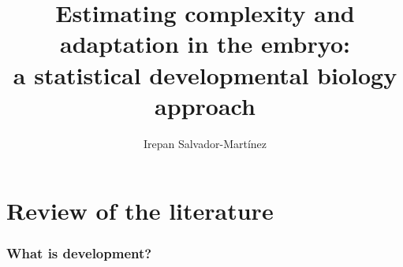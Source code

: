 \documentclass[officiallayout]{tktla_modified}
\title{\hfill\break \hfill\break   %
Estimating complexity and adaptation 
in the embryo:
\\ a statistical developmental biology approach
}
\author{Irepan Salvador-Mart\'inez}
\begin{document}
\frontmatter

\maketitle
\makenomenclature

\begin{acknowledgements}
  
\end{acknowledgements}

\renewcommand{\baselinestretch}{0.8}\small
\tableofcontents
\renewcommand{\baselinestretch}{1.0}\normalsize

\mainmatter



	

\printnomenclature


	


\chapter{Review of the literature}




\subsection*{What is development?}
	
	
\end{document}
